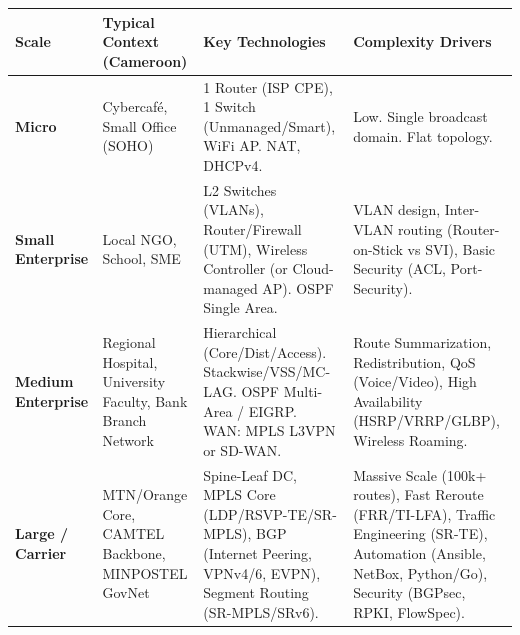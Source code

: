 \documentclass[11pt]{article}
\begin{document}
\begin{center}
\begin{tabularx}{\linewidth}{|l|X|X|X|}
\hline
\rowcolor{popblueL}
\textbf{Scale} & \textbf{Typical Context (Cameroon)} & \textbf{Key Technologies} & \textbf{Complexity Drivers} \\
\hline
\textbf{Micro} & Cybercafé, Small Office (SOHO) & 1 Router (ISP CPE), 1 Switch (Unmanaged/Smart), WiFi AP. NAT, DHCPv4. & Low. Single broadcast domain. Flat topology. \\
\textbf{Small Enterprise} & Local NGO, School, SME & L2 Switches (VLANs), Router/Firewall (UTM), Wireless Controller (or Cloud-managed AP). OSPF Single Area. & VLAN design, Inter-VLAN routing (Router-on-Stick vs SVI), Basic Security (ACL, Port-Security). \\
\textbf{Medium Enterprise} & Regional Hospital, University Faculty, Bank Branch Network & Hierarchical (Core/Dist/Access). Stackwise/VSS/MC-LAG. OSPF Multi-Area / EIGRP. WAN: MPLS L3VPN or SD-WAN. & Route Summarization, Redistribution, QoS (Voice/Video), High Availability (HSRP/VRRP/GLBP), Wireless Roaming. \\
\textbf{Large / Carrier} & MTN/Orange Core, CAMTEL Backbone, MINPOSTEL GovNet & Spine-Leaf DC, MPLS Core (LDP/RSVP-TE/SR-MPLS), BGP (Internet Peering, VPNv4/6, EVPN), Segment Routing (SR-MPLS/SRv6). & Massive Scale (100k+ routes), Fast Reroute (FRR/TI-LFA), Traffic Engineering (SR-TE), Automation (Ansible, NetBox, Python/Go), Security (BGPsec, RPKI, FlowSpec). \\
\hline
\end{tabularx}
\end{center}
\end{document}
